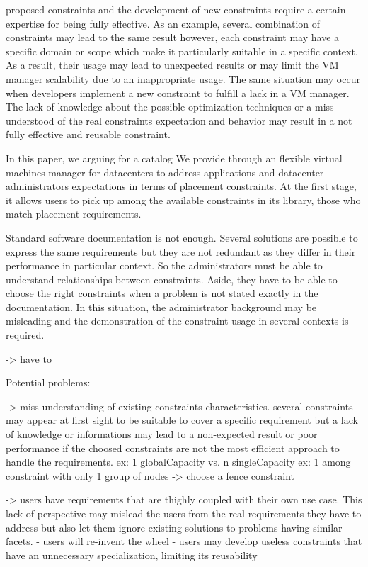 proposed constraints and the development of new constraints require
a certain expertise for being fully effective. As an example, several combination of constraints
may lead to the same result however, each constraint may have a specific domain or scope which make it particularly suitable in a specific context. As a result, their usage may lead to unexpected results or may limit the VM manager scalability due to an inappropriate usage.
%
The same situation may occur when developers implement a new constraint to fulfill a lack in a VM manager. The lack of knowledge about the possible optimization techniques or a miss-understood
of the real constraints expectation and behavior may result in a not fully effective and reusable constraint.


In this paper, we arguing for a catalog 
We provide through {\btrp} an flexible virtual machines manager for datacenters to
address applications and datacenter administrators expectations in terms of placement constraints.
At the first stage, it allows users to pick up among the available constraints in its library, those who
match placement requirements.
%

Standard software documentation is not enough.
Several solutions are possible to express the same requirements but they are not redundant as they differ in their performance in particular context. So the administrators must be able to understand relationships between constraints. Aside, they have to be able to choose the right constraints when a problem is not stated exactly in the documentation. In this situation, the administrator background may be misleading and the demonstration of the constraint usage in several contexts is required.

-> have to 

Potential problems:

-> miss understanding of existing constraints characteristics.
   several constraints  may appear at first sight to be suitable to cover a specific requirement but a lack of knowledge or informations may lead to a non-expected result or poor performance if the choosed constraints are not the most efficient approach to handle the requirements.
       ex: 1 globalCapacity vs. n singleCapacity
       ex: 1 among constraint with only 1 group of nodes -> choose a fence constraint

-> users have requirements that are thighly coupled with their own use case.
   This lack of perspective may mislead the users from the real requirements they have to address but also let them ignore existing solutions to problems having similar facets.
   - users will re-invent the wheel
   - users may develop useless constraints that have an unnecessary specialization, limiting its reusability

